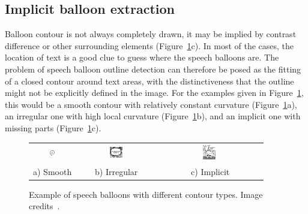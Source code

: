


\subsection{Implicit balloon extraction} %
\label{sub:se:implicit_balloon_extraction}

Balloon contour is not always completely drawn, it may be implied by contrast difference or other surrounding elements (Figure~\ref{fig:se:balloon_examples}c).
In most of the cases, the location of text is a good clue to guess where the speech balloons are.
The problem of speech balloon outline detection can therefore be posed as the fitting of a closed contour around text areas, with the distinctiveness that the outline might not be explicitly defined in the image.
For the examples given in Figure~\ref{fig:se:balloon_examples}, this would be a smooth contour with relatively constant curvature (Figure~\ref{fig:se:balloon_examples}a), an irregular one with high local curvature (Figure~\ref{fig:se:balloon_examples}b), and an implicit one with missing parts (Figure~\ref{fig:se:balloon_examples}c).

	\begin{figure}[!ht]%
	\begin{center}
	  \begin{tabular}{ccc}
	  \includegraphics[trim= 0px 2px 0mm 0mm, clip, width=0.13\textwidth]{round_balloon.png}&
	  \includegraphics[trim= 0mm 0mm 0mm 0mm, clip, width=0.17\textwidth]{peaked_balloon.png}&
	  \includegraphics[trim= 15px 7mm 5px 0mm, clip, width=0.145\textwidth]{open_balloon.png} \\ 
	  \footnotesize a) Smooth	& \footnotesize b) Irregular & \footnotesize c) Implicit
	  \end{tabular}
	\caption[Speech balloon contour types]{Example of speech balloons with different contour types. Image credits~\cite{Bubble09}.}
	\label{fig:se:balloon_examples}
	\end{center}
	\end{figure}	

